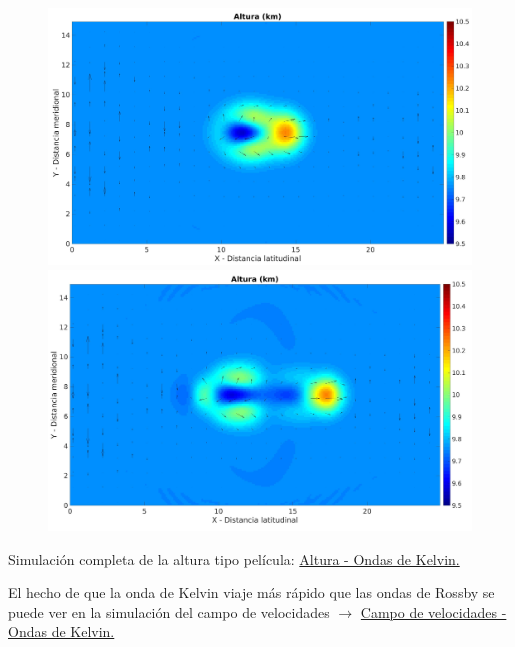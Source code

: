 \documentclass[12pt,dvipsnames]{exam}
\begin{document}
\begin{figure}[H]
\begin{minipage}[b]{0.5\linewidth} 
\centering
\includegraphics[scale=0.2]{k3.jpeg}
\caption{ }
\label{k3}
\end{minipage}
\hspace{0.1cm} 
\begin{minipage}[b]{0.5\linewidth}
\centering
\includegraphics[scale=0.2]{k4.jpeg}
\caption{}
\label{k4}
\end{minipage}
\end{figure}

Simulación completa de la altura tipo película: \href{https://www.youtube.com/watch?v=iLz2mouRf5g&list=PLO4Ke9LzSkdFyMJ0r6OuJdeCk4Ys-RJ3t&index=3}{Altura - Ondas de Kelvin.}

El hecho de que la onda de Kelvin viaje más rápido que las ondas de Rossby se puede ver en la simulación del campo de velocidades $\xrightarrow{}$ \href{https://www.youtube.com/watch?v=8LDt5eNZDg0&list=PLO4Ke9LzSkdFyMJ0r6OuJdeCk4Ys-RJ3t&index=4}{Campo de velocidades - Ondas de Kelvin.}
\end{document}
